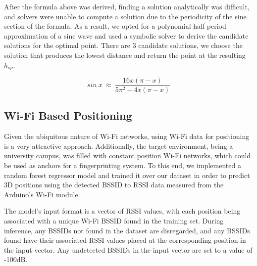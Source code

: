 After the formula above was derived, finding a solution analytically was difficult, and solvers were unable to compute a solution due to the periodicity of the sine section of the formula. As a result, we opted for a polynomial half period approximation of a sine wave  and used a symbolic solver to derive the candidate solutions for the optimal point. There are 3 candidate solutions, we choose the solution that produces the lowest distance and return the point at the resulting $h_{sp}$. 

$$sin\ x\ \approx\ \frac{16x(\pi-x)}{5\pi^2-4x(\pi-x)}$$

\subsection{Wi-Fi Based Positioning}
Given the ubiquitous nature of Wi-Fi networks, using Wi-Fi data for positioning is a very attractive approach. Additionally, the target environment, being a university campus, was filled with constant position Wi-Fi networks, which could be used as anchors for a fingerprinting system. To this end, we implemented a random forest regressor model and trained it over our dataset in order to predict 3D positions using the detected BSSID to RSSI data measured from the Arduino's Wi-Fi module. \cite{pedregosa_2011_scikitlearn}
\par

The model's input format is a vector of RSSI values, with each position being associated with a unique Wi-Fi BSSID found in the training set. During inference, any BSSIDs not found in the dataset are disregarded, and any BSSIDs found have their associated RSSI values placed at the corresponding position in the input vector. Any undetected BSSIDs in the input vector are set to a value of -100dB.
\par

